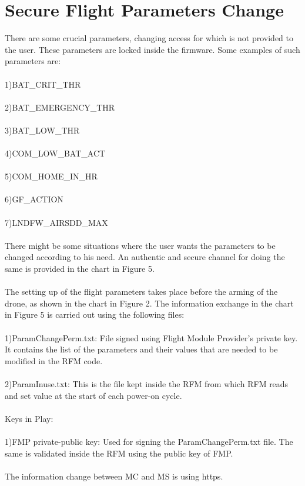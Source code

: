 \documentclass[18pt]{article}
\begin{document}
\newpage
\section{Secure Flight Parameters Change}
There are some crucial parameters, changing access for which is not provided to the user. These parameters are locked inside the firmware. Some examples of such parameters are:\\
\\
1)BAT\_CRIT\_THR\\
\\
2)BAT\_EMERGENCY\_THR\\
\\
3)BAT\_LOW\_THR\\
\\
4)COM\_LOW\_BAT\_ACT\\
\\
5)COM\_HOME\_IN\_HR\\
\\
6)GF\_ACTION\\
\\
7)LNDFW\_AIRSDD\_MAX\\
\\
There might be some situations where the user wants the parameters to be changed according to his need. An authentic and secure channel for doing the same is provided in the chart in Figure 5.\\
\\
The setting up of the flight parameters takes place before the arming of the drone, as shown in the chart in Figure 2. The information exchange in the chart in Figure 5 is carried out using the following files:\\
\\
1)ParamChangePerm.txt: File signed using Flight Module Provider's private key. It contains the list of the parameters and their values that are needed to be modified in the RFM code.\\
\\
2)ParamInuse.txt: This is the file kept inside the RFM from which RFM reads and set value at the start of each power-on cycle.\\
\\
Keys in Play:\\
\\
1)FMP private-public key: Used for signing the
ParamChangePerm.txt file. The same is validated inside the RFM using the public key of FMP.\\
\\
The information change between MC and MS is using https.
\end{document}
